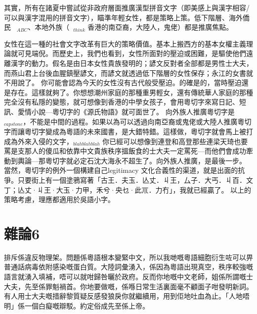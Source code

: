 \documentclass[a5paper, 10pt, openany]{book} %
\begin{document}
其實，所有在諸夏中嘗試從非政府層面推廣漢型拼音文字（即美感上與漢字相容/可以與漢字混用的拼音文字），瞄準年輕女性，都是策略上策。低下階層、海外僑民$_{ABC}$、本地外族（$_{think}$ 香港的南亞裔，大陸人，鬼佬）都是推廣焦點。

女性在這一種的社會文字改革有巨大的策略價值。基本上搬西方的基本女權主義理論就可見端倪。而歷史上，我們也看到，女性所面對的壓迫或困難，是驅使他們遠離漢字的動力。假名是由日本女性貴族發明的；諺文反對者全部都是男性士大夫，而燕山君上台後血腥鎮壓諺文，而諺文就透過低下階層的女性保存；永江的女書就不用說了。
你可能會認為今天的女性沒有古代般受壓迫。的確是的，當時壓迫還是存在。這樣就夠了。你想想潮州家庭的那種重男輕女，還有傳統華人家庭的那種完全沒有私隱的變態，就可想像到香港的中學女孩子，會用粵切字來寫日記、短訊、愛情小說—粵切字的《源氏物語》就可面世了。
向外族人推廣粵切字是$_{capstone}$，不能是中間的過程。如果以為可以透過向南亞裔或鬼佬或大陸人推廣粵切字而讓粵切字變成為粵語的未來國書，是大錯特錯。這樣做，粵切字就會馬上被打成為外來入侵的文字，$_{blahblahblah}$ 你已經可以想像到連登和高登那些連梁天琦也要罵是支那人的傻瓜和依靠中文貴族秩序搵飯食的士大夫一定罵死—而他們會成功牽動到輿論—那粵切字就必定石沈大海永不超生了。向外族人推廣，是最後一步。
當然，粵切字的例外一個構建自己legitimacy 文化合義性的渠道，就是出面的抗爭。只要街上有一個塗鴉寫著「古王．夫玉．亾丈．丩王，厶子．大丐．丩百．文丁；亾丈·丩王·大玉·力甲，禾兮·央乜·此𥘅．力冇」，我就已經贏了。
以上的策略考慮，理應都適用於吳語小字。


\chapter{雜論6}
排斥係違反物理架。問題係粵語根本變緊中文，所以我哋嘅粵語細胞衍生咗可以畀普通話病毒依附感染嘅蛋白質。大陸詞彙湧入，係因為粵語出現真空，秩序較強嘅語言就湧入填補，唔可以就咁歸咎曬於政府。反而你地嘅中文老師，姐係所謂嘅士大夫，先至係罪魁禍首。你地要做嘅，係喺日常生活裏面毫不顧面子咁發明新詞。有人用士大夫嘅措辭黎質疑反感發狼戾你就繼續用，用到佢地吐血為止。「人地唔明」係一個白癡嘅辯駁。約定俗成先至係上帝。
\end{document}
